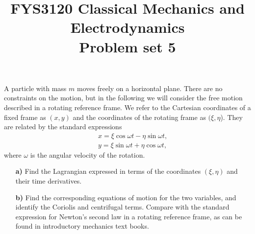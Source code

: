 \documentclass[11pt,a4paper]{report}
\title{FYS3120 Classical Mechanics and Electrodynamics\\ 
\vspace{15mm}Problem set 5}
\newcounter{excount}[chapter]
\newenvironment{exercise}[1][]{\addtocounter{excount}{1} \noindent {\bf Problem
    \arabic{excount} \ \ #1}\hspace{2mm}}{\vspace{4mm}}
\begin{document}
\maketitle


\begin{exercise}
A particle with mass $m$ moves freely on a horizontal plane. There are no constraints on the motion, but in the following we will consider the free motion described in a rotating reference frame. We refer to the Cartesian coordinates of a fixed frame as $(x,y)$ and the coordinates of the rotating frame as $(\xi,\eta$). They are related by the standard expressions
\begin{eqnarray}
&&x=\xi\cos\omega t-\eta\sin\omega t, \\
&&y=\xi\sin\omega t+\eta\cos\omega t,
\end{eqnarray}
where $\omega$ is the angular velocity of the rotation.

\begin{itemize}
\item[\bf a)] Find the Lagrangian expressed in terms of the coordinates $(\xi,\eta)$ and their time derivatives.
\item[\bf b)] Find the corresponding equations of motion for the two variables, and identify the Coriolis and centrifugal terms.
Compare with the standard expression for Newton's second law in a rotating reference frame, as can be found in introductory mechanics text books.
\end{itemize}
\end{exercise}
\end{document}
